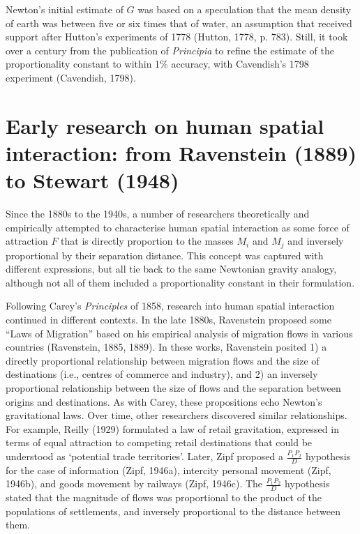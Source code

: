 \documentclass[
11pt, %
oneside, %
english, %
singlespacing, %
]{macthesis} %
\begin{document}
Newton's initial estimate of \(G\) was based on a speculation that the mean density of earth was between five or six times that of water, an assumption that received support after Hutton's experiments of 1778 (Hutton, 1778, p. 783). Still, it took over a century from the publication of \emph{Principia} to refine the estimate of the proportionality constant to within 1\% accuracy, with Cavendish's 1798 experiment (Cavendish, 1798).

\section{Early research on human spatial interaction: from Ravenstein (1889) to Stewart (1948)}\label{early-research-on-human-spatial-interaction-from-ravenstein-1889-to-stewart-1948}

Since the 1880s to the 1940s, a number of researchers theoretically and empirically attempted to characterise human spatial interaction as some force of attraction \(F\) that is directly proportion to the masses \(M_i\) and \(M_j\) and inversely proportional by their separation distance. This concept was captured with different expressions, but all tie back to the same Newtonian gravity analogy, although not all of them included a proportionality constant in their formulation.

Following Carey's \emph{Principles} of 1858, research into human spatial interaction continued in different contexts. In the late 1880s, Ravenstein proposed some ``Laws of Migration'' based on his empirical analysis of migration flows in various countries (Ravenstein, 1885, 1889). In these works, Ravenstein posited 1) a directly proportional relationship between migration flows and the size of destinations (i.e., centres of commerce and industry), and 2) an inversely proportional relationship between the size of flows and the separation between origins and destinations. As with Carey, these propositions echo Newton's gravitational laws. Over time, other researchers discovered similar relationships. For example, Reilly (1929) formulated a law of retail gravitation, expressed in terms of equal attraction to competing retail destinations that could be understood as `potential trade territories'. Later, Zipf proposed a \(\frac{P_1P_2}{D}\) hypothesis for the case of information (Zipf, 1946a), intercity personal movement (Zipf, 1946b), and goods movement by railways (Zipf, 1946c). The \(\frac{P_1P_2}{D}\) hypothesis stated that the magnitude of flows was proportional to the product of the populations of settlements, and inversely proportional to the distance between them.
\end{document}
